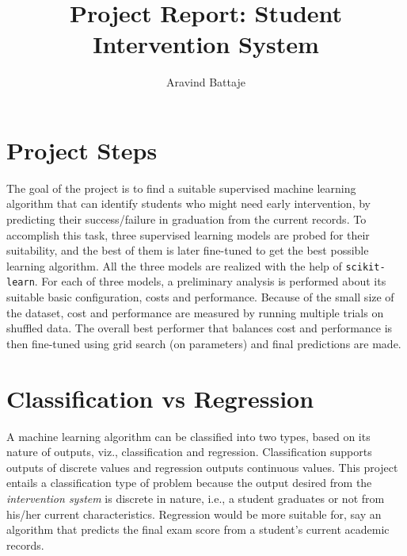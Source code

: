 \documentclass{article}
\begin{document}
	
	\title{Project Report: Student Intervention System}
	\author{Aravind Battaje}
	\maketitle
	
	\section{Project Steps}
	The goal of the project is to find a suitable supervised machine learning algorithm that can identify students who might need early intervention, by predicting their success/failure in graduation from the current records. To accomplish this task, three supervised learning models are probed for their suitability, and the best of them is later fine-tuned to get the best possible learning algorithm. All the three models are realized with the help of \texttt{scikit-learn}. For each of three models, a preliminary analysis is performed about its suitable basic configuration, costs and performance. Because of the small size of the dataset, cost and performance are measured by running multiple trials on shuffled data. The overall best performer that balances cost and performance is then fine-tuned using grid search (on parameters) and final predictions are made.
	
	\section{Classification vs Regression}
	A machine learning algorithm can be classified into two types, based on its nature of outputs, viz., classification and regression. Classification supports outputs of discrete values and regression outputs continuous values. This project entails a classification type of problem because the output desired from the \emph{intervention system} is discrete in nature, i.e., a student graduates or not from his/her current characteristics. Regression would be more suitable for, say an algorithm that predicts the final exam score from a student's current academic records.
	
\end{document}
